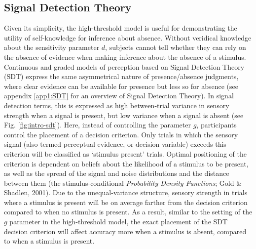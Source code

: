 \documentclass[12pt,twoside]{reedthesis}
\begin{document}
\hypertarget{sdt}{%
\subsection*{Signal Detection Theory}\label{sdt}}

Given its simplicity, the high-threshold model is useful for demonstrating the utility of self-knowledge for inference about absence. Without veridical knowledge about the sensitivity parameter \(d\), subjects cannot tell whether they can rely on the absence of evidence when making inference about the absence of a stimulus. Continuous and graded models of perception based on Signal Detection Theory (SDT) express the same asymmetrical nature of presence/absence judgments, where clear evidence can be available for presence but less so for absence (see appendix \ref{app1:SDT} for an overview of Signal Detection Theory). In signal detection terms, this is expressed as high between-trial variance in sensory strength when a signal is present, but low variance when a signal is absent (see Fig. \ref{fig:intro-sdt}). Here, instead of controlling the parameter \(g\), participants control the placement of a decision criterion. Only trials in which the sensory signal (also termed perceptual evidence, or decision variable) exceeds this criterion will be classified as `stimulus present' trials. Optimal positioning of the criterion is dependent on beliefs about the likelihood of a stimulus to be present, as well as the spread of the signal and noise distributions and the distance between them (the stimulus-conditional \emph{Probability Density Functions}; Gold \& Shadlen, 2001). Due to the unequal-variance structure, sensory strength in trials where a stimulus is present will be on average farther from the decision criterion compared to when no stimulus is present. As a result, similar to the setting of the \(g\) parameter in the high-threshold model, the exact placement of the SDT decision criterion will affect accuracy more when a stimulus is absent, compared to when a stimulus is present.
\end{document}

